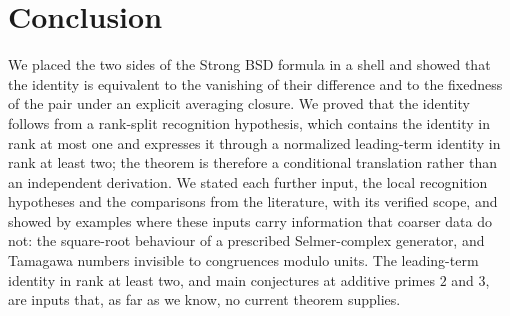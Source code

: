 \section{Conclusion}\label{sec:conclusion}

We placed the two sides of the Strong BSD formula in a shell and showed
that the identity is equivalent to the vanishing of their difference and
to the fixedness of the pair under an explicit averaging closure.  We
proved that the identity follows from a rank-split recognition
hypothesis, which contains the identity in rank at most one and
expresses it through a normalized leading-term identity in rank at least
two; the theorem is therefore a conditional translation rather than an
independent derivation.  We stated each further input, the local
recognition hypotheses and the comparisons from the literature, with its
verified scope, and showed by examples where these inputs carry
information that coarser data do not: the square-root behaviour of a
prescribed Selmer-complex generator, and Tamagawa numbers invisible to
congruences modulo units.  The leading-term identity in rank at least two,
and main conjectures at additive primes $2$ and $3$, are inputs that, as
far as we know, no current theorem supplies.
